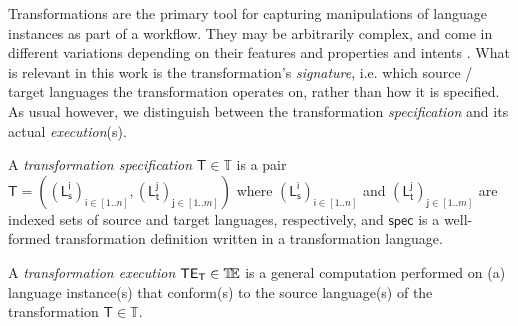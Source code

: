 Transformations are the primary tool for capturing manipulations of language 
instances as part of a workflow. They may be arbitrarily complex, and come in 
different variations depending on their features \cite{J:Mens-VonGorp:2006} and 
properties and intents \cite{J:Lucio-Amrani-etAl:2014}. What is relevant in 
this work is the transformation's \emph{signature}, i.e. which source / target 
languages the transformation operates on, rather than how it is specified. As 
usual however, we distinguish between the transformation \emph{specification} 
and its actual \emph{execution}(s).

\begin{Definition}
   A \emph{transformation specification} $\mathsf{T}\in\mathbb{T}$ is a pair
$\mathsf{T} = ((\mathsf{L_s^{i}})_{\mathsf{i}\in [1..n]}, 
(\mathsf{L_t^{j}})_{\mathsf{j}\in[1..m]})$ where  
$(\mathsf{L_s^{i}})_{\mathsf{i}\in [1..n]}$ and
$(\mathsf{L_t^{j}})_{\mathsf{j}\in [1..m]}$ are indexed sets of source and
target languages, respectively, and $\mathsf{spec}$ is a well-formed 
transformation definition written in a transformation language.

   A \emph{transformation execution} $\mathsf{TE_{T}}\in\mathbb{T}\!\mathbb{E}$ is a general 
computation performed on (a) language instance(s) that conform(s) to the source 
language(s) of the transformation $\mathsf{T}\in\mathbb{T}$.
\end{Definition}




